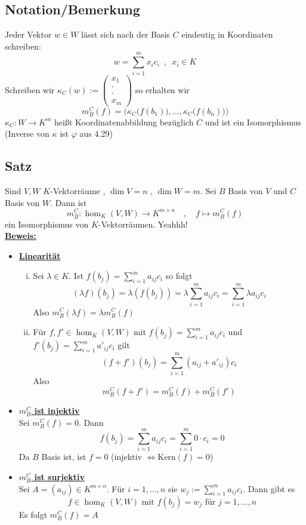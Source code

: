 \subsection{Notation/Bemerkung} %
\label{sub:notation_bemerkung}
Jeder Vektor $w \in W$ lässt sich nach der Basis $C$ eindeutig in Koordinaten schreiben:
\[
	w= \sum\limits_{i=1}^{m} x_i c_i \enspace , \enspace x_i \in K
\]
Schreiben wir $\kappa_C (w) := \left(\begin{smallmatrix}
	x_1 \\ \cdot \\ \cdot \\ x_m
\end{smallmatrix} \right)$ so erhalten wir
\[
	m_B^C (f) = \bigg( \kappa_C \big( f(b_1)\big) , \ldots , \kappa_C \big( f(b_n) \big) \bigg)
\]
$\kappa_C : W \to K^m$ heißt Koordinatenabbildung bezüglich $C$ und ist ein Isomorphismus \\
(Inverse von $\kappa$ ist $\varphi$ aus 4.29)

\subsection{Satz} %
\label{sub:satz}
Sind $V,W$ \(K\)-Vektorräume , $\dim V = n$ , $\dim W = m$. Sei $B$ Basis von $V$ und $C$ Basis von $W$. Dann ist
\[
	m_B^C : \hom_K (V,W) \to K^{m \times n} \quad , \quad f \mapsto m_B^C (f)
\]
ein Isomorphismus von \(K\)-Vektorräumen. Yeahhh!
\vspace{\baselineskip} \\
\underline{\textbf{Beweis:}} 
\begin{itemize}
	\item \underline{\textbf{Linearität}} \\
	\begin{enumerate}[(i)]
		\item Sei $\lambda \in K$. Ist $f(b_j) = \sum\limits_{i=1}^{m} a_{ij} c_i$ so folgt
		\[
			(\lambda f)(b_j)= \lambda (f(b_j)) = \lambda \sum\limits_{i=1}^{m} a_{ij} c_i = \sum\limits_{i=1}^{m} \lambda a_{ij} c_i
		\]
		Also $m_B^C(\lambda f)= \lambda m_B^C(f)$
		\item Für $f,f' \in \hom_K(V,W)$ mit $f(b_j)= \sum\limits_{i=1}^{m} a_{ij} c_i$ und $f'(b_j) = \sum\limits_{i=1}^{m} a'_{ij} c_i$ gilt
		\[
			(f+f')(b_j) = \sum\limits_{i=1}^{m} (a_{ij} + a'_{ij}) c_i
		\]
		Also
		\[
			m_B^C (f+f') = m_B^C(f)+ m_B^C (f')
		\]
	\end{enumerate}
	\item \underline{\textbf{$m_B^C$ ist injektiv}} \\
	Sei $m_B^C (f) =0$. Dann 
	\[
		f(b_j)= \sum\limits_{i=1}^{m} a_{ij} c_i = \sum\limits_{i=1}^{m} 0 \cdot  c_i = 0
	\]
	Da $B$ Basis ist, ist $f=0$ (injektiv $\Leftrightarrow \text{Kern}(f) = 0$)
	\item \underline{ \textbf{$m_B^C$ ist surjektiv}} \\
	Sei $A= (a_{ij}) \in K^{m \times n}$. Für $i=1, \ldots , n$ sie $w_j := \sum\limits_{i=1}^{m} a_{ij} c_i$. Dann gibt es
	\[
		f \in \hom_K (V,W) \text{ mit } f(b_j)= w_j \text{ für } j=1, \ldots , n
	\]
	Es folgt $m_B^C (f) = A$
\end{itemize}

